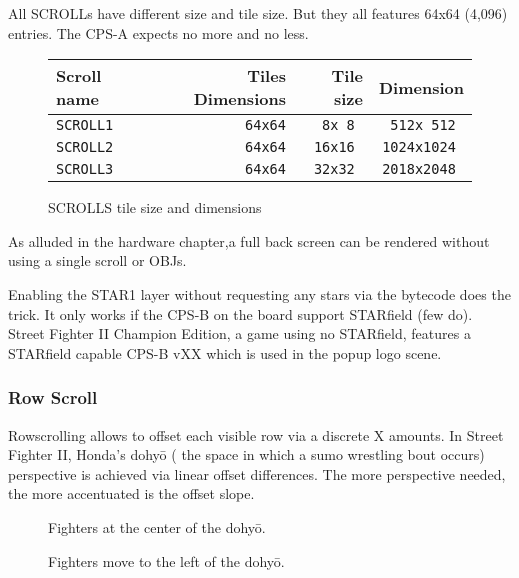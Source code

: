 All SCROLLs have different size and tile size. But they all features 64x64 (4,096) entries. The CPS-A expects no more and no less. 
 \begin{figure}[H]
\begin{tabularx}{\textwidth}{Xrrr}
  \toprule    
  \textbf{Scroll name } & \textbf{ Tiles Dimensions } & \textbf{ Tile size }  & \textbf{Dimension }\\  
  \toprule   
    
\texttt{SCROLL1} & \texttt{64x64} & \texttt{8x 8 } &  \texttt{512x 512 }  \\  
\texttt{SCROLL2} & \texttt{64x64} & \texttt{16x16 } &  \texttt{1024x1024 }   \\  
\texttt{SCROLL3} & \texttt{64x64} & \texttt{32x32 } &  \texttt{2018x2048 }   \\  
  \toprule   
\end{tabularx}
\vspace*{-1mm} %
\caption*{SCROLLS tile size and dimensions}
\end{figure}

As alluded in the hardware chapter,a  full back screen can be rendered without using a single scroll or OBJs.

Enabling the STAR1 layer without requesting any stars via the bytecode does the trick. It only works if the CPS-B on the board support STARfield (few do). Street Fighter II Champion Edition, a game using no STARfield, features a STARfield capable CPS-B vXX which is used in the popup logo scene.



\subsubsection{Row Scroll}
Rowscrolling allows to offset each visible row via a discrete X amounts. In Street Fighter II, Honda's dohyō ( the space in which a sumo wrestling bout occurs) perspective is achieved via linear offset differences. The more perspective needed, the more accentuated is the offset slope. 

\begin{figure}[H]
\caption*{Fighters at the center of the dohyō.}
 \end{figure}%

\begin{figure}[H]
\caption*{Fighters move to the left of the dohyō.}
 \end{figure}%

